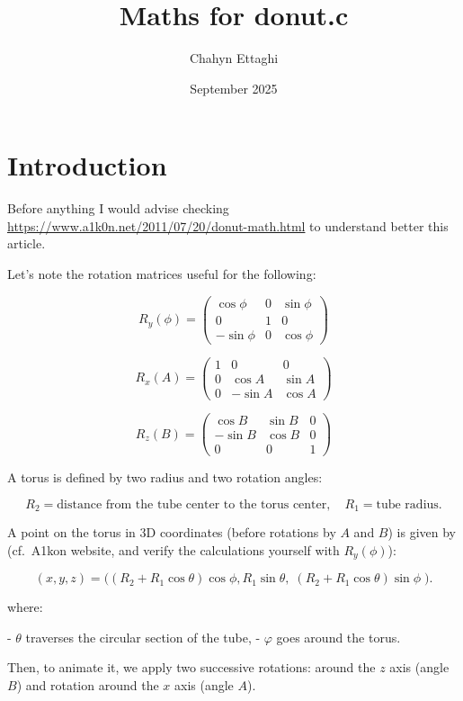 \documentclass{article}
\title{Maths for donut.c}
\author{Chahyn Ettaghi}
\date{September 2025}
\begin{document}
\maketitle

\section{Introduction}
Before anything I would advise checking \underline{https://www.a1k0n.net/2011/07/20/donut-math.html} to understand better this article.

Let's note the rotation matrices useful for the following: 

\[
R_y(\phi) =
\begin{pmatrix}
\cos\phi & 0 & \sin\phi \\
0 & 1 & 0 \\
-\sin\phi & 0 & \cos\phi
\end{pmatrix}
\]


\[
R_x(A) =
\begin{pmatrix}
1 & 0 & 0 \\
0 & \cos A & \sin A \\
0 & -\sin A & \cos A
\end{pmatrix}
\]


\[
R_z(B) =
\begin{pmatrix}
\cos B & \sin B & 0 \\
-\sin B & \cos B & 0 \\
0 & 0 & 1
\end{pmatrix}
\]

A torus is defined by two radius and two rotation angles: 

\[
R_2 = \text{distance from the tube center to the torus center}, \quad
R_1 = \text{tube radius}.
\]

A point on the torus in 3D coordinates (before rotations by $A$ and $B$) is given by (cf.\ A1kon website, and verify the calculations yourself with $R_y(\phi)$):


\[
(x,y,z) =
\bigl((R_2 + R_1 \cos \theta)\cos \phi, R_1 \sin \theta,\; 
(R_2 + R_1 \cos \theta)\sin \phi \; 
 \bigr).
\]

where:  

- $\theta$ traverses the circular section of the tube,  
- $\varphi$ goes around the torus.  

\medskip

Then, to animate it, we apply two successive rotations: around the $z$ axis (angle $B$) and rotation around the $x$ axis (angle $A$).  
\end{document}
